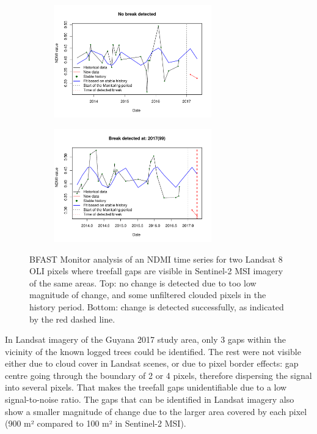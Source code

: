 \documentclass[a4paper,12pt]{scrbook}
\begin{document}
\begin{figure}
  \begin{subfigure}{\textwidth}
    \centering
    \includegraphics[width=0.75\textwidth]{thesis-figures/09-guyana17-landsat-ndmi-undetected-c}
  \end{subfigure}
  \begin{subfigure}{\textwidth}
    \centering
    \includegraphics[width=0.75\textwidth]{thesis-figures/10-guyana17-landsat-ndmi-detected-b}
  \end{subfigure}
  
  \caption{\ac{BFAST} Monitor analysis of an \ac{NDMI} time series for two Landsat 8 \ac{OLI} pixels where treefall gaps are visible in Sentinel-2 \ac{MSI} imagery of the same areas. Top: no change is detected due to too low magnitude of change, and some unfiltered clouded pixels in the history period. Bottom: change is detected successfully, as indicated by the red dashed line.}
  \label{fig-guyana17-landsat-ndmi}
\end{figure}

In Landsat imagery of the Guyana 2017 study area, only 3 gaps within the vicinity of the known logged trees could be identified. The rest were not visible either due to cloud cover in Landsat scenes, or due to pixel border effects: gap centre going through the boundary of 2 or 4 pixels, therefore dispersing the signal into several pixels. That makes the treefall gaps unidentifiable due to a low signal-to-noise ratio. The gaps that can be identified in Landsat imagery also show a smaller magnitude of change due to the larger area covered by each pixel (900 m² compared to 100 m² in Sentinel-2 \ac{MSI}).
\end{document}
